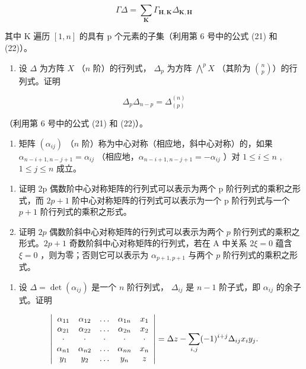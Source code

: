\[
\Gamma \Delta = \sum_ {\mathbf {K}} \Gamma_ {\mathbf {H}, \mathbf {K}} \Delta_ {\mathbf {K}, \mathbf {H}}
\]

其中 K 遍历 \([1, n]\) 的具有 p 个元素的子集（利用第 6 号中的公式 (21) 和 (22)）。

\begin{enumerate}
\def\labelenumi{\arabic{enumi}.}
\setcounter{enumi}{10}
\tightlist
\item
  设 \(\Delta\) 为方阵 \(X\) （\(n\) 阶）的行列式， \(\Delta_p\) 为方阵 \(\bigwedge^p X\) （其阶为 \(\binom{n}{p}\)）的行列式。证明
\end{enumerate}

\[
\Delta_ {p} \Delta_ {n - p} = \Delta_ {(p)} ^ {(n)}
\]

（利用第 6 号中的公式 (21) 和 (22)）。

\begin{enumerate}
\def\labelenumi{\arabic{enumi}.}
\setcounter{enumi}{11}
\tightlist
\item
  矩阵 \((\alpha_{ij})\) （\(n\) 阶）称为中心对称（相应地，斜中心对称）的，如果 \(\alpha_{n - i + 1, n - j + 1} = \alpha_{ij}\) （相应地，\(\alpha_{n - i + 1, n - j + 1} = -\alpha_{ij}\) ）对 \(1 \leqslant i \leqslant n\) , \(1 \leqslant j \leqslant n\) 成立。
\end{enumerate}

\begin{enumerate}
\def\labelenumi{(\alph{enumi})}
\item
  证明 2p 偶数阶中心对称矩阵的行列式可以表示为两个 p 阶行列式的乘积之形式，而 \(2p + 1\) 阶中心对称矩阵的行列式可以表示为一个 p 阶行列式与一个 \(p + 1\) 阶行列式的乘积之形式。
\item
  证明 \(2p\) 偶数阶斜中心对称矩阵的行列式可以表示为两个 \(p\) 阶行列式的乘积之形式。\(2p + 1\) 奇数阶斜中心对称矩阵的行列式，若在 A 中关系 \(2\xi = 0\) 蕴含 \(\xi = 0\) ，则为零；否则它可以表示为 \(\alpha_{p+1,p+1}\) 与两个 \(p\) 阶行列式的乘积之形式。
\end{enumerate}

\begin{enumerate}
\def\labelenumi{\arabic{enumi}.}
\setcounter{enumi}{12}
\tightlist
\item
  设 \(\Delta = \det(\alpha_{ij})\) 是一个 \(n\) 阶行列式， \(\Delta_{ij}\) 是 \(n - 1\) 阶子式，即 \(\alpha_{ij}\) 的余子式。证明
\end{enumerate}

\[
\left| \begin{array}{c c c c c} \alpha_ {1 1} & \alpha_ {1 2} & \ldots & \alpha_ {1 n} & x _ {1} \\ \alpha_ {2 1} & \alpha_ {2 2} & \ldots & \alpha_ {2 n} & x _ {2} \\ \cdot & \cdot & \cdot & \cdot & \cdot \\ \alpha_ {n 1} & \alpha_ {n 2} & \ldots & \alpha_ {n n} & x _ {n} \\ y _ {1} & y _ {2} & \ldots & y _ {n} & z \end{array} \right| = \Delta z - \sum_ {i, j} (- 1) ^ {i + j} \Delta_ {i j} x _ {i} y _ {j}.
\]

